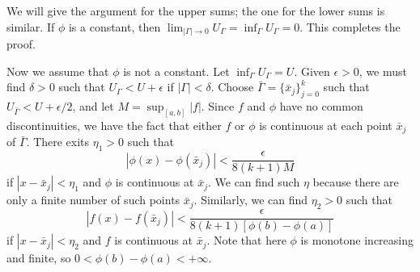 \begin{exercise}{2.12}
We will give the argument for the upper sums; the one for the lower sums is similar.
If $\phi$ is a constant, then $\lim_{|\Gamma|\to0}U_\Gamma=\inf_{\Gamma}U_\Gamma=0$.
This completes the proof.

Now we assume that $\phi$ is not a constant.
Let $\inf_{\Gamma}U_\Gamma=U$. Given $\epsilon>0$, we must find $\delta>0$ such that $U_{\Gamma}<U+\epsilon$ if $|\Gamma|<\delta$. Choose $\bar{\Gamma}=\{\bar{x}_j\}_{j=0}^k$ such that $U_{\bar{\Gamma}}<U+\epsilon/2$, and let $M=\sup_{[a,b]}|f|$. Since $f$ and $\phi$ have no common discontinuities, we have the fact that  either $f$ or $\phi$ is continuous at each point $\bar{x}_j$ of $\bar{\Gamma}$. There exits $\eta_1>0$ such that
$$|\phi(x)-\phi(\bar{x}_j)|<\frac{\epsilon}{8(k+1)M}$$
if $|x-\bar{x}_j|<\eta_1$ and  $\phi$ is continuous at $\bar{x}_j$.
We can find such $\eta$ because there are only a finite number of such points $\bar{x}_j$.
Similarly, we can find $\eta_2>0$ such that
$$|f(x)-f(\bar{x}_j)|<\frac{\epsilon}{8(k+1)[\phi(b)-\phi(a)]}$$
if $|x-\bar{x}_j|<\eta_2$ and $f$ is continuous at $\bar{x}_j$.
Note that here $\phi$ is monotone increasing and finite, so $0<\phi(b)-\phi(a)<+\infty$.


\end{exercise}
